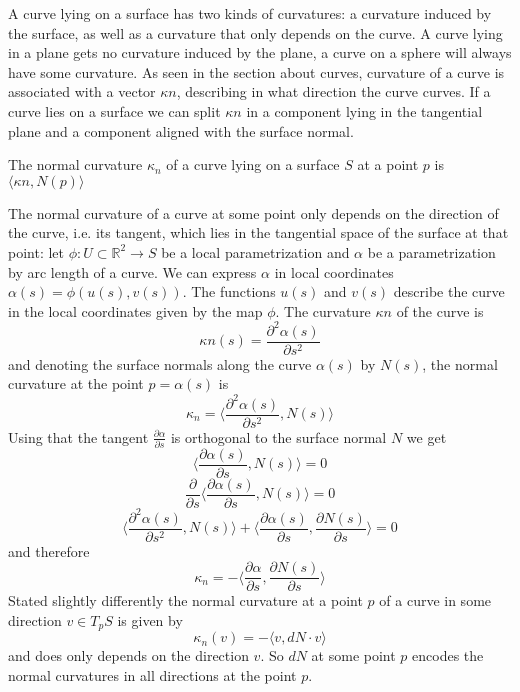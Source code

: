 A curve lying on a surface has two kinds of curvatures: a curvature induced by the surface, as well as a curvature that only depends on the curve. A curve lying in a plane gets no curvature induced by the plane, a curve on a sphere will always have some curvature. As seen in the section about curves, curvature of a curve is associated with a vector $\kappa n$, describing in what direction the curve curves. If a curve lies on a surface we can split $\kappa n$ in a component lying in the tangential plane and a component aligned with the surface normal.

\begin{definition} The normal curvature $\kappa_n$ of a curve lying on a surface $S$ at a point $p$ is $\langle \kappa n, N(p)\rangle$ 
\end{definition}
The normal curvature of a curve at some point only depends on the direction of the curve, i.e. its tangent, which lies in the tangential space of the surface at that point:
let $\phi: U \subset \mathbb R^2 \rightarrow S$ be a local parametrization and $\alpha$ be a parametrization by arc length of a curve. We can express $\alpha$ in local coordinates $\alpha(s) = \phi(u(s), v(s))$.  The functions $u(s)$ and $v(s)$ describe the curve in the local coordinates given by the map $\phi$. The curvature $\kappa n$ of the curve is 
\[\kappa n(s) = \frac{\partial^2 \alpha(s)}{\partial s^2}\]
and denoting the surface normals along the curve $\alpha(s)$ by $N(s)$, the normal curvature at the point $p = \alpha(s)$ is 
\[\kappa_n = \langle\frac{\partial^2 \alpha(s)}{\partial s^2}, N(s)\rangle\]
Using that the tangent $\frac{\partial \alpha}{\partial s}$ is orthogonal to the surface normal $N$ we get
\[\langle\frac{\partial \alpha(s)}{\partial s}, N(s)\rangle = 0 \]
\[ \frac{\partial}{\partial s} \langle\frac{\partial \alpha(s)}{\partial s}, N(s)\rangle = 0\]
\[\langle\frac{\partial^2 \alpha(s)}{\partial s^2}, N(s)\rangle + \langle\frac{\partial \alpha(s)}{\partial s}, \frac{\partial N(s)}{\partial s}\rangle  = 0\]
and therefore 
\[\kappa_n = -\langle\frac{\partial \alpha}{\partial s}, \frac{\partial N(s)}{\partial s}\rangle\]
Stated slightly differently the normal curvature at a point $p$ of a curve in some direction $v \in T_pS$ is given by
\[\kappa_n(v) =  -\langle v, dN \cdot v\rangle \]
and does only depends on the direction $v$. So $dN$ at some point $p$ encodes the normal curvatures in all directions at the point $p$.


